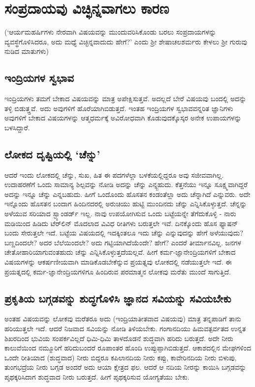 \chapter{ಸಂಪ್ರದಾಯವು ವಿಚ್ಛಿನ್ನವಾಗಲು ಕಾರಣ}

(`ಆರ್ಯಮಹರ್ಷಿಗಳು ನೇರವಾಗಿ ವಿಷಯವನ್ನು ಮುಂದುವರಿಸಿಕೊಂಡು ಬರಲು ಸಂಪ್ರದಾಯಗಳನ್ನು ವ್ಯವಸ್ಥೆಗೊಳಿಸಿದರೂ, ಅದು ಮಧ್ಯೆ  ವಿಚ್ಛಿನ್ನವಾದುದು ಹೇಗೆ?' ಎಂದು ಶ್ರೀ ಶೇಷಾಚಲಶರ್ಮರು ಕೇಳಲು ಶ್ರೀ ಗುರುವು ನುಡಿದ ಮಾತುಗಳು)

\section*{ಇಂದ್ರಿಯಗಳ ಸ್ವಭಾವ}

ಇಂದ್ರಿಯಗಳು ತಮಗೆ ಬೇಕಾದ ವಿಷಯವನ್ನು ಮಾತ್ರ ಅಪೇಕ್ಷಿಸುತ್ತವೆ. ಅದಲ್ಲದೆ ಬೇರೆ ವಿಷಯವು ಬಂದಲ್ಲಿ ಅದನ್ನು ತಳ್ಳಿ ಬಿಡುತ್ತ್ತವೆ. ಅದು ಅವುಗಳಿಗೆ ಹೊರೆಯಾಗಿಬಿಡುತ್ತದೆ. ಇಂತಹ ಇಂದ್ರಿಯಗಳ ಸ್ವಭಾವವನ್ನರಿತ ಜ್ಞಾನಿಗಳು ಅವುಗಳಿಗೆ ಬೇಕಾದ ವಿಷಯಗಳನ್ನು ಆತ್ಮಧರ್ಮಕ್ಕೆ ಅವಿರೋಧವಾಗಿ ಕೊಡುವುದಕ್ಕೊಸ್ಕರ ಅನೇಕ ಉಪಾಯಗಳನ್ನು ಬಳಸಿದ್ದಾರೆ.

\section*{ಲೋಕದ ದೃಷ್ಟಿಯಲ್ಲಿ `ಚೆನ್ನು'}

ಆದರೆ ಇಂದು ಲೋಕದಲ್ಲಿ ಚೆನ್ನು, ಸುಖ, ಹಿತ ಈ ಪದಗಳೆಲ್ಲಾ ಬಳಕೆಯಲ್ಲಿದ್ದರೂ ಅವು ಸಜೀವವಾಗಿಲ್ಲ. ಉದಾಹರಣೆಗೆ ಒಂದು ಸಾಮಾನ್ಯ ಶಿಲ್ಪವನ್ನು ನೋಡಿ ಅದನ್ನು ಚೆನ್ನು ಎನ್ನ್ಬಹುದು. ಕೆತ್ತನೆಯು ಇನ್ನೂ ಸೂಕ್ಷ್ಮವಾಗಿದ್ದರೆ ಅದನ್ನು ಇನ್ನೂ ಚೆನ್ನು ಎನ್ನಬಹುದು. ಹೀಗೆ ಒಂದೊಂದು ಹೊಸತನ ಕಂಡಂತೆಲ್ಲಾ ಅದು ಚೆನ್ನಾಗಿದೆ ಎನ್ನುವರು. ಅದೇ ಇನ್ನೊಂದು ಹೊಸತನ ಬಂದಾಗ ಹಿಂದಿನದರಲ್ಲಿ ಅರುಚಿಯು ಹುಟ್ಟಿ  ಮುಂದಿನದು ಚೆನ್ನು ಎನ್ನಿಸಿಕೊಳ್ಳುತ್ತದೆ. ಚೆನ್ನನ್ನು ಅಳೆಯುವ ಸರಿಯಾದ ಸ್ಟ್ಯಾಂಡರ್ಡ್ ಇಲ್ಲ. ನಾವು ಉಪಯೋಗಿಸುವ ಒಂದು ಬಟ್ಟೆಯನ್ನೇ  ತೆಗೆದುಕೊಳ್ಳಿ - ನಾರು ಮಡಿಯಿಂದ ಹಿಡಿದು ಟೆರ್‌ಲಿನ್ ಮೊದಲಾದ ವಿವಿಧ ರೀತಿಗಳು ಬರುತ್ತಲೇ ಇವೆ. ದಿನಕ್ಕೊಂದು ಹೊಸ ಫ್ಯಾಷನ್ ಬಂದು ಸೇರುತ್ತಲೇ ಇದೆ. ಬಟ್ಟೆಯ ವಿಷಯದಲ್ಲಿ ಇದಕ್ಕಿಂತಲೂ ಇದು ಚೆನ್ನು ಎನ್ನುವುದನ್ನು ಹೇಗೆ ಅಳೆಯುವುದು? ಬಣ್ಣದಿಂದಲೇ? ಅದರ ಬೆಲೆಯಿಂದಲೇ? ಅದು ಗಟ್ಟಿಯಾಗಿದೆಯೆಂದೇ? ಹೇಗೆ? ಎಂದರೆ ತೀರ್ಮಾನವಿಲ್ಲ. ಜನಗಳ ಚೇತೋಹಾರಿಯಾಗುವಂತಹುದು ಚೆನ್ನು ಎನ್ನಿಸಿಕೊಳ್ಳುತ್ತದೆಯಲ್ಲವೆ. ಹೀಗೆ ಕರ್ಮ-ಜ್ಞಾನೇಂದ್ರಿಯಗಳಿಗೆ ಬೇಕಾದ ವಿಷಯಗಳನ್ನು ಆಕರ್ಷಣೀಯವಾಗಿ ಮಾಡಿಕೊಡಬೇಕೆನ್ನುವ ಪ್ರಯತ್ನವು ಲೋಕದಲ್ಲಿ ನಡೆಯುತ್ತಲೇ ಇದೆ. ಈ ಪ್ರಯತ್ನದಲ್ಲಿ ಕರ್ಮ-ಜ್ಞಾನೇಂದ್ರಿಯಗಳಿಗೂ ಹಿಂದಿರುವ ಪರಮಾತ್ಮನ ಲೋಕವು ಮರೆತು ಮುಂದೆ ಸಾಗುತ್ತಿದೆ.

\section*{ಪ್ರಕೃತಿಯ ಬಗ್ಗಡವನ್ನು ಶುದ್ಧಗೊಳಿಸಿ ಜ್ಞಾನದ ಸವಿಯನ್ನು ಸವಿಯಬೇಕು}

ಅಂತಹ ವಿಷಯವನ್ನು ಲೋಕವು ಮರೆತರೂ ಅದು (ಇಂದ್ರಿಯಾತೀತವಾದ ವಿಷಯವು) ಮಾತ್ರ ತನ್ನಪಾಡಿಗೆ ತಾನು ಹರಿಯುತ್ತಲೇ ಇದೆ. ಆದರೆ ನಿಜವಾದ ಸವಿಯನ್ನು ನೋಡಿ ತಿಳಿಯಬೇಕು. ಗಂಗಾನದಿಯು ಹಿಮವತ್ಪರ್ವತದ ಉನ್ನತ ಶಿಖರದಿಂದ ಭುವಿಯ ಸಂಪರ್ಕವಿಲ್ಲದೆ ಧಿಮಿ-ಧಿಮಿ ತಾಳದೊಡನೆ ಶುದ್ಧವಾಗಿ ಹರಿದು ಬರುತ್ತದೆ. ಅದೇ ನೀರು ಕಾಲುವೆಯಿಂದ ನಮ್ಮೂರಿಗೆ ಹರಿದುಬಂದರೆ ರೂಪಾಂತರ ಹೊಂದಿ ಉಪ್ಪುಪ್ಪಾಗಿಬಿಡುತ್ತದೆ. ಆಕಾಶದಲ್ಲಿನ ಮೇಘಗಳಿಂದ ಒಂದೇ ರೀತಿಯಾದ (ಶುದ್ಧವಾದ) ನೀರು ಬಿದ್ದರೂ ಕಪಿಲಾನದಿಯ ನೀರು ಕಪ್ಪು, ಕಾವೇರಿನದಿಯ ನೀರು ಬಿಳುಪು, ತುಂಗಭದ್ರೆಯ ನೀರು ಬಗ್ಗಡ ಅಂದರೆ ಅದು ಆಯಾ ಕ್ಷೇತ್ರದ ಫಲ. ಆದರೆ ಆ ನದಿಯ ನೀರನ್ನು ಕಾಯಿಸಿ ಬಗ್ಗಡವನ್ನು ಪೃಥಕ್ಕರಿಸಿದಾಗ ಶುದ್ಧವಾದ ನೀರು ಬರುತ್ತದೆ. ಹೀಗೆ ಪೃಥಕ್ಕರಿಸುವ ಯೋಗ್ಯತೆಯು ಬೇಕು.

